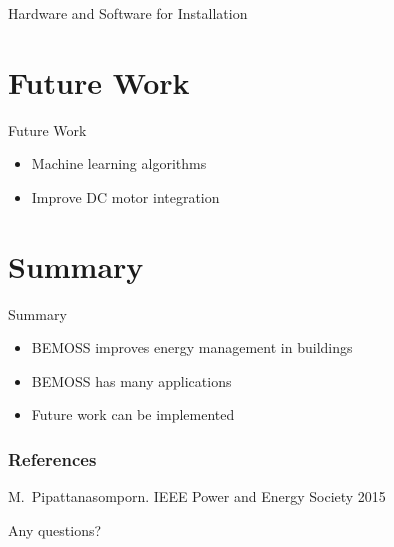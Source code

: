 \documentclass{beamer}
\begin{document}
\begin{frame}{Hardware and Software for Installation}{}
\begin{itemize}
	\end{itemize}
\end{frame}

\section{Future Work}
\begin{frame}{Future Work}{}
	\begin{itemize}
		\item Machine learning algorithms
		\item Improve DC motor integration
	\end{itemize}
\end{frame}

\section*{Summary}

\begin{frame}{Summary}
  \begin{itemize}
  \item BEMOSS improves energy management in buildings
  \item BEMOSS has many applications
  \item Future work can be implemented
  \end{itemize}
\end{frame}




\begin{frame}[allowframebreaks]
  \frametitle<presentation>{References}
    
  \begin{thebibliography}{10}
    
  \beamertemplatebookbibitems

 
    
  \beamertemplatearticlebibitems
   
    M.~Pipattanasomporn.
    \newblock IEEE Power and Energy Society 2015
  \end{thebibliography}
\end{frame}

\begin{frame}
\center\Huge
Any questions?
\end{frame}
\end{document}
